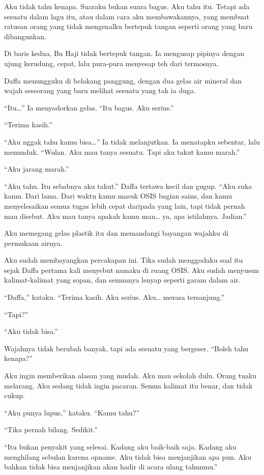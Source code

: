 \documentclass[11pt,twoside,openany]{book}
\makeatletter
\newcommand{\scenebreak}{\par\vspace{0.9em}{\centering\textsc{*\hspace{0.7em}*\hspace{0.7em}*}\par}\vspace{0.9em}\@afterindentfalse\@afterheading}
\makeatother
\begin{document}
Aku tidak tahu kenapa. Suaraku bukan suara bagus. Aku tahu itu. Tetapi ada sesuatu dalam lagu itu, atau dalam cara aku membawakannya, yang membuat ratusan orang yang tidak mengenalku bertepuk tangan seperti orang yang baru dibangunkan.

Di baris kedua, Bu Haji tidak bertepuk tangan. Ia mengusap pipinya dengan ujung kerudung, cepat, lalu pura-pura menyesap teh dari termosnya.

\scenebreak
Daffa menungguku di belakang panggung, dengan dua gelas air mineral dan wajah seseorang yang baru melihat sesuatu yang tak ia duga.

``Itu\ldots{}'' Ia menyodorkan gelas. ``Itu bagus. Aku serius.''

``Terima kasih.''

``Aku nggak tahu kamu bisa\ldots{}'' Ia tidak melanjutkan. Ia menatapku sebentar, lalu menunduk. ``Wulan. Aku mau tanya sesuatu. Tapi aku takut kamu marah.''

``Aku jarang marah.''

``Aku tahu. Itu sebabnya aku takut.'' Daffa tertawa kecil dan gugup. ``Aku suka kamu. Dari lama. Dari waktu kamu masuk OSIS bagian sains, dan kamu menyelesaikan semua tugas lebih cepat daripada yang lain, tapi tidak pernah mau disebut. Aku mau tanya apakah kamu mau\ldots{} ya, apa istilahnya. Jadian.''

Aku memegang gelas plastik itu dan memandangi bayangan wajahku di permukaan airnya.

Aku sudah membayangkan percakapan ini. Tika sudah menggodaku soal itu sejak Daffa pertama kali menyebut namaku di ruang OSIS. Aku sudah menyusun kalimat-kalimat yang sopan, dan semuanya lenyap seperti garam dalam air.

``Daffa,'' kataku. ``Terima kasih. Aku serius. Aku\ldots{} merasa tersanjung.''

``Tapi?''

``Aku tidak bisa.''

Wajahnya tidak berubah banyak, tapi ada sesuatu yang bergeser. ``Boleh tahu kenapa?''

Aku ingin memberikan alasan yang mudah. Aku mau sekolah dulu. Orang tuaku melarang. Aku sedang tidak ingin pacaran. Semua kalimat itu benar, dan tidak cukup.

``Aku punya lupus,'' kataku. ``Kamu tahu?''

``Tika pernah bilang. Sedikit.''

``Itu bukan penyakit yang selesai. Kadang aku baik-baik saja. Kadang aku menghilang sebulan karena opname. Aku tidak bisa menjanjikan apa pun. Aku bahkan tidak bisa menjanjikan akan hadir di acara ulang tahunmu.''
\end{document}
